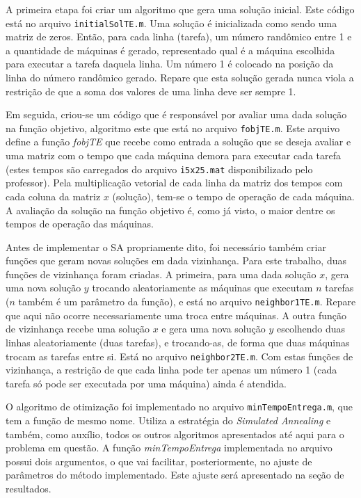 \documentclass[conference]{IEEEtran}
\begin{document}
A primeira etapa foi criar um algoritmo que gera uma solução inicial. Este código está no arquivo \texttt{initialSolTE.m}. Uma solução é inicializada como sendo uma matriz de zeros. Então, para cada linha (tarefa), um número randômico entre 1 e a quantidade de máquinas é gerado, representado qual é a máquina escolhida para executar a tarefa daquela linha. Um número 1 é colocado na posição da linha do número randômico gerado. Repare que esta solução gerada nunca viola a restrição de que a soma dos valores de uma linha deve ser sempre 1.

Em seguida, criou-se um código que é responsável por avaliar uma dada solução na função objetivo, algoritmo este que está no arquivo \texttt{fobjTE.m}. Este arquivo define a função \emph{fobjTE} que recebe como entrada a solução que se deseja avaliar e uma matriz com o tempo que cada máquina demora para executar cada tarefa (estes tempos são carregados do arquivo \texttt{i5x25.mat} disponibilizado pelo professor). Pela multiplicação vetorial de cada linha da matriz dos tempos com cada coluna da matriz $x$ (solução), tem-se o tempo de operação de cada máquina. A avaliação da solução na função objetivo é, como já visto, o maior dentre os tempos de operação das máquinas.

Antes de implementar o SA propriamente dito, foi necessário também criar funções que geram novas soluções em dada vizinhança. Para este trabalho, duas funções de vizinhança foram criadas. A primeira, para uma dada solução $x$, gera uma nova solução $y$ trocando aleatoriamente as máquinas que executam $n$ tarefas ($n$ também é um parâmetro da função), e está no arquivo \texttt{neighbor1TE.m}. Repare que aqui não ocorre necessariamente uma troca entre máquinas. A outra função de vizinhança recebe uma solução $x$ e gera uma nova solução $y$ escolhendo duas linhas aleatoriamente (duas tarefas), e trocando-as, de forma que duas máquinas trocam as tarefas entre si. Está no arquivo \texttt{neighbor2TE.m}. Com estas funções de vizinhança, a restrição de que cada linha pode ter apenas um número 1 (cada tarefa só pode ser executada por uma máquina) ainda é atendida.

O algoritmo de otimização foi implementado no arquivo \texttt{minTempoEntrega.m}, que tem a função de mesmo nome. Utiliza a estratégia do \textit{Simulated Annealing} e também, como auxílio, todos os outros algoritmos apresentados até aqui para o problema em questão. A função \textit{minTempoEntrega} implementada no arquivo possui dois argumentos, o que vai facilitar, posteriormente, no ajuste de parâmetros do método implementado. Este ajuste será apresentado na seção de resultados.
\end{document}

